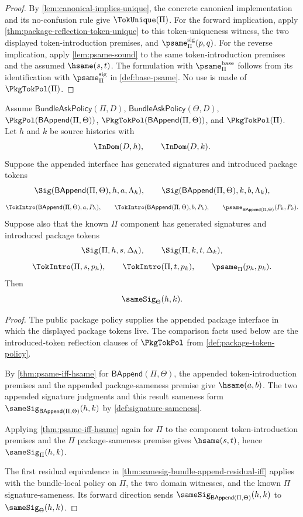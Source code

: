 \begin{proof}
By \autoref{lem:canonical-implies-unique}, the concrete canonical implementation and its no-confusion rule give \(\TokUnique(\Pi)\). For the forward implication, apply \autoref{thm:package-reflection-token-unique} to this token-uniqueness witness, the two displayed token-introduction premises, and \(\psame_{\Pi}^{\mathrm{sig}}(p,q)\). For the reverse implication, apply \autoref{lem:psame-sound} to the same token-introduction premises and the assumed \(\hsame(s,t)\). The formulation with \(\psame_{\Pi}^{\mathrm{base}}\) follows from its identification with \(\psame_{\Pi}^{\mathrm{sig}}\) in \autoref{def:base-psame}. No use is made of \(\PkgTokPol(\Pi)\).
\end{proof}

\begin{theorem}
\label{thm:signature-append-residual-known-token-component}
Assume $\mathsf{BundleAskPolicy}(\Pi,D)$, $\mathsf{BundleAskPolicy}(\Theta,D)$,
$\PkgPol(\mathsf{BAppend}(\Pi,\Theta))$,
$\PkgTokPol(\mathsf{BAppend}(\Pi,\Theta))$, and $\PkgTokPol(\Pi)$.
Let $h$ and $k$ be source histories with
$$
\InDom(D,h),\qquad \InDom(D,k).
$$
Suppose the appended interface has generated signatures and introduced package tokens
$$
\Sig(\mathsf{BAppend}(\Pi,\Theta),h,a,\Lambda_h),\qquad
\Sig(\mathsf{BAppend}(\Pi,\Theta),k,b,\Lambda_k),
$$
$$
\TokIntro(\mathsf{BAppend}(\Pi,\Theta),a,P_h),\qquad
\TokIntro(\mathsf{BAppend}(\Pi,\Theta),b,P_k),\qquad
\psame_{\mathsf{BAppend}(\Pi,\Theta)}(P_h,P_k).
$$
Suppose also that the known $\Pi$ component has generated signatures and introduced package tokens
$$
\Sig(\Pi,h,s,\Delta_h),\qquad
\Sig(\Pi,k,t,\Delta_k),
$$
$$
\TokIntro(\Pi,s,p_h),\qquad
\TokIntro(\Pi,t,p_k),\qquad
\psame_{\Pi}(p_h,p_k).
$$
Then
$$
\sameSig_{\Theta}(h,k).
$$
\end{theorem}

\begin{proof}
The public package policy supplies the appended package interface in which the displayed package tokens live. The comparison facts used below are the introduced-token reflection clauses of $\PkgTokPol$ from \autoref{def:package-token-policy}.

By \autoref{thm:psame-iff-hsame} for $\mathsf{BAppend}(\Pi,\Theta)$, the appended token-introduction premises and the appended package-sameness premise give $\hsame(a,b)$. The two appended signature judgments and this result sameness form $\sameSig_{\mathsf{BAppend}(\Pi,\Theta)}(h,k)$ by \autoref{def:signature-sameness}.

Applying \autoref{thm:psame-iff-hsame} again for $\Pi$ to the component token-introduction premises and the $\Pi$ package-sameness premise gives $\hsame(s,t)$, hence $\sameSig_{\Pi}(h,k)$.

The first residual equivalence in \autoref{thm:samesig-bundle-append-residual-iff} applies with the bundle-local policy on $\Pi$, the two domain witnesses, and the known $\Pi$ signature-sameness. Its forward direction sends $\sameSig_{\mathsf{BAppend}(\Pi,\Theta)}(h,k)$ to $\sameSig_{\Theta}(h,k)$.
\end{proof}

